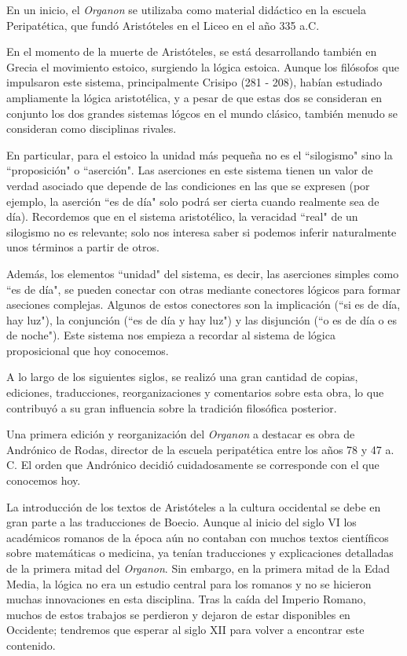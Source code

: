 \documentclass{article}
\begin{document}
En un inicio, el \textit{Organon} se utilizaba como material didáctico en la escuela Peripatética, que fundó Aristóteles en el Liceo en el año 335 a.C.

En el momento de la muerte de Aristóteles, se está desarrollando también en Grecia el movimiento estoico, surgiendo la lógica estoica. Aunque los filósofos que impulsaron este sistema, principalmente Crisipo (281 - 208), habían estudiado ampliamente la lógica aristotélica, y a pesar de que estas dos se consideran en conjunto los dos grandes sistemas lógcos en el mundo clásico, también menudo se consideran como disciplinas rivales.

En particular, para el estoico la unidad más pequeña no es el ``silogismo" sino la ``proposición" o ``aserción". Las aserciones en este sistema tienen un valor de verdad asociado que depende de las condiciones en las que se expresen (por ejemplo, la aserción ``es de día" solo podrá ser cierta cuando realmente sea de día). Recordemos que en el sistema aristotélico, la veracidad ``real" de un silogismo no es relevante; solo nos interesa saber si podemos inferir naturalmente unos términos a partir de otros.

Además, los elementos ``unidad" del sistema, es decir, las aserciones simples como ``es de día", se pueden conectar con otras mediante conectores lógicos para formar aseciones complejas. Algunos de estos conectores son la implicación (``si es de día, hay luz"), la conjunción (``es de día y hay luz") y las disjunción (``o es de día o es de noche")\cite{algra1999cambridge}. Este sistema nos empieza a recordar al sistema de lógica proposicional que hoy conocemos.

A lo largo de los siguientes siglos, se realizó una gran cantidad de copias, ediciones, traducciones, reorganizaciones y comentarios sobre esta obra, lo que contribuyó a su gran influencia sobre la tradición filosófica posterior.

Una primera edición y reorganización del \textit{Organon} a destacar es obra de Andrónico de Rodas, director de la escuela peripatética entre los años 78 y 47 a. C. El orden que Andrónico decidió cuidadosamente se corresponde con el que conocemos hoy\cite{hatzimichali2013texts}.

La introducción de los textos de Aristóteles a la cultura occidental se debe en gran parte a las traducciones de Boecio. Aunque al inicio del siglo VI los académicos romanos de la época aún no contaban con muchos textos científicos sobre matemáticas o medicina, ya tenían traducciones y explicaciones detalladas de la primera mitad del \textit{Organon}\cite{charles2004latin}. Sin embargo, en la primera mitad de la Edad Media, la lógica no era un estudio central para los romanos y no se hicieron muchas innovaciones en esta disciplina\cite{marebon2008logic}. Tras la caída del Imperio Romano, muchos de estos trabajos se perdieron y dejaron de estar disponibles en Occidente; tendremos que esperar al siglo XII para volver a encontrar este contenido.
\end{document}
